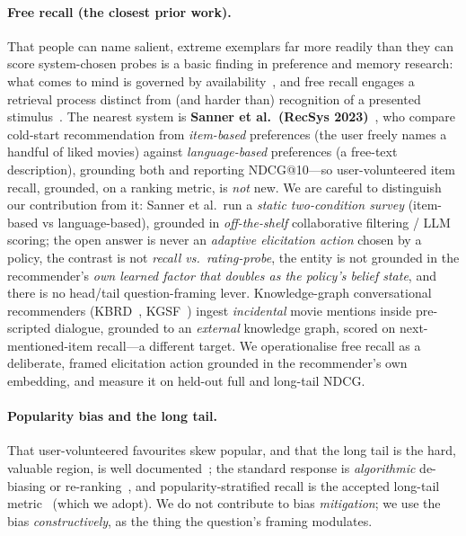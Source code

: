 \documentclass[11pt]{article}
\begin{document}
\paragraph{Free recall (the closest prior work).} That people can name salient, extreme exemplars far more readily than
they can score system-chosen probes is a basic finding in preference and memory research: what comes to mind is governed
by availability~\cite{tversky73}, and free recall engages a retrieval process distinct from (and harder than) recognition
of a presented stimulus~\cite{anderson72}. The nearest system is
\textbf{Sanner et al.\ (RecSys 2023)}~\cite{sanner23}, who compare cold-start recommendation from \emph{item-based} preferences (the user
freely names a handful of liked movies) against \emph{language-based} preferences (a free-text description), grounding
both and reporting NDCG@10---so user-volunteered item recall, grounded, on a ranking metric, is \emph{not} new. We are
careful to distinguish our contribution from it: Sanner et al.\ run a \emph{static two-condition survey} (item-based vs
language-based), grounded in \emph{off-the-shelf} collaborative filtering / LLM scoring; the open answer is never an
\emph{adaptive elicitation action} chosen by a policy, the contrast is not \emph{recall vs.\ rating-probe}, the entity is
not grounded in the recommender's \emph{own learned factor that doubles as the policy's belief state}, and there is no
head/tail question-framing lever. Knowledge-graph conversational recommenders (KBRD~\cite{kbrd}, KGSF~\cite{kgsf}) ingest \emph{incidental}
movie mentions inside pre-scripted dialogue, grounded to an \emph{external} knowledge graph, scored on next-mentioned-item
recall---a different target. We operationalise free recall as a deliberate, framed elicitation action grounded in the
recommender's own embedding, and measure it on held-out full and long-tail NDCG.

\paragraph{Popularity bias and the long tail.} That user-volunteered favourites skew popular, and that the long tail is
the hard, valuable region, is well documented~\cite{cremonesi10,abdollahpouri19}; the standard response is \emph{algorithmic} de-biasing or re-ranking~\cite{abdollahpouri19}, and
popularity-stratified recall is the accepted long-tail metric~\cite{cremonesi10} (which we adopt). We do not contribute to bias
\emph{mitigation}; we use the bias \emph{constructively}, as the thing the question's framing modulates.
\end{document}

